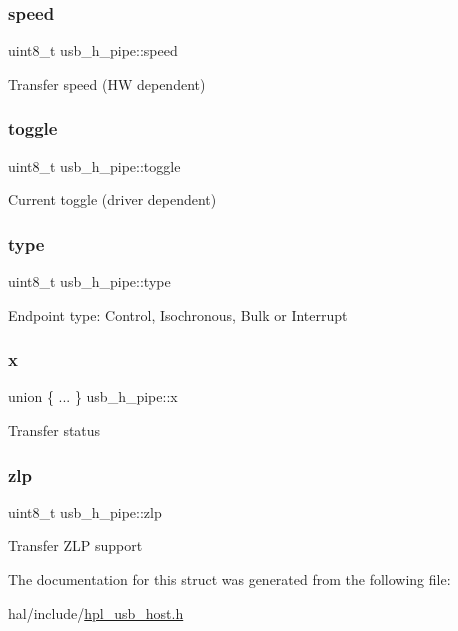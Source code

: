 \subsubsection{\texorpdfstring{speed}{speed}}
{\footnotesize\ttfamily uint8\+\_\+t usb\+\_\+h\+\_\+pipe\+::speed}

Transfer speed (HW dependent) \mbox{\label{structusb__h__pipe_a9b4ba000ae376cb0bf4636265b138023}} 
\subsubsection{\texorpdfstring{toggle}{toggle}}
{\footnotesize\ttfamily uint8\+\_\+t usb\+\_\+h\+\_\+pipe\+::toggle}

Current toggle (driver dependent) \mbox{\label{structusb__h__pipe_a78c1a9f6df30f3e05576a16634d5d5c4}} 
\subsubsection{\texorpdfstring{type}{type}}
{\footnotesize\ttfamily uint8\+\_\+t usb\+\_\+h\+\_\+pipe\+::type}

Endpoint type\+: Control, Isochronous, Bulk or Interrupt \mbox{\label{structusb__h__pipe_ae3ce2d3ae00e7abc79ef4d44ff3c4c8a}} 
\subsubsection{\texorpdfstring{x}{x}}
{\footnotesize\ttfamily union \{ ... \}   usb\+\_\+h\+\_\+pipe\+::x}

Transfer status \mbox{\label{structusb__h__pipe_a777c0bcdb187e73738c23213edf27c66}} 
\subsubsection{\texorpdfstring{zlp}{zlp}}
{\footnotesize\ttfamily uint8\+\_\+t usb\+\_\+h\+\_\+pipe\+::zlp}

Transfer Z\+LP support 

The documentation for this struct was generated from the following file\+:\begin{DoxyCompactItemize}
\item 
hal/include/\hyperlink{hpl__usb__host_8h}{hpl\+\_\+usb\+\_\+host.\+h}\end{DoxyCompactItemize}

